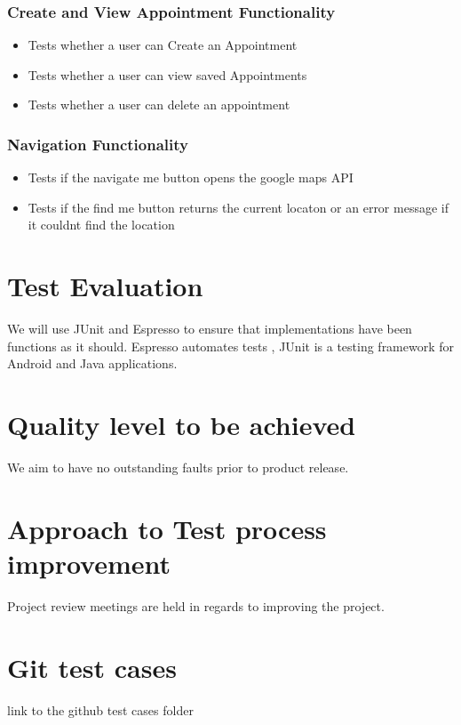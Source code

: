 \documentclass[english]{article}
\begin{document}
		\subsubsection{Create and View Appointment Functionality}
		\begin{itemize}
			\item Tests whether a user can Create an Appointment
			\item Tests whether a user can view saved Appointments
			\item Tests whether a user can delete an appointment
\\
					\href{url}{}
		\end{itemize}
		\subsubsection{Navigation Functionality}
		\begin{itemize}
			\item Tests if the navigate me button opens the google maps API
			\item Tests if the find me button returns the current locaton or an error message if it couldnt find the location
\\
					\href{url}{}
		\end{itemize}
		
			
	
		

	\section{Test Evaluation}
	
	We will use JUnit and Espresso to ensure that implementations have been functions as it should.
	Espresso automates tests ,  JUnit is a testing framework for Android and Java applications.
	\section{Quality level to be achieved}
	We aim to have no outstanding faults prior to product release.
	
	\section{Approach to Test process improvement}
	
	Project review meetings are held in regards to improving the project.
	
	
	 
	\section{Git test cases  }
	link to the github test cases folder
\end{document}

